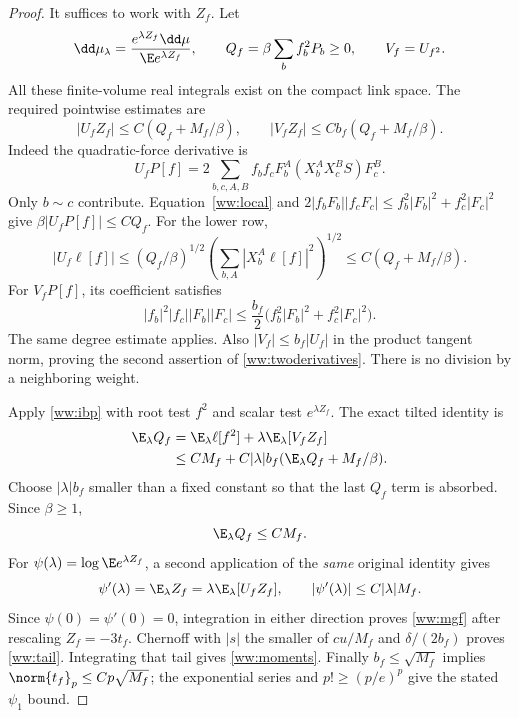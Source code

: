 \begin{proof}
It suffices to work with $Z_f$. Let
\[
 \dd\mu_\lambda
 =\frac{e^{\lambda Z_f}\dd\mu}{\E e^{\lambda Z_f}},
 \qquad
 Q_f=\beta\sum_bf_b^2P_b\ge0,
 \qquad V_f=U_{f^2}.
\]
All these finite-volume real integrals exist on the compact link space. The required pointwise estimates are
\begin{equation}
 |U_fZ_f|\le C(Q_f+M_f/\beta),\qquad
 |V_fZ_f|\le Cb_f(Q_f+M_f/\beta).
 \label{ww:twoderivatives}
\end{equation}
Indeed the quadratic-force derivative is
\[
 U_fP[f]
 =2\sum_{b,c,A,B}f_bf_cF_b^A
      (X_b^AX_c^BS)F_c^B.
\]
Only $b\sim c$ contribute. Equation~\eqref{ww:local} and
$2|f_bF_b||f_cF_c|\le f_b^2|F_b|^2+f_c^2|F_c|^2$ give
$\beta|U_fP[f]|\le CQ_f$. For the lower row,
\[
 |U_f\ell[f]|
 \le (Q_f/\beta)^{1/2}
       \left(\sum_{b,A}|X_b^A\ell[f]|^2\right)^{1/2}
 \le C(Q_f+M_f/\beta).
\]
For $V_fP[f]$, its coefficient satisfies
\[
 |f_b|^2|f_c||F_b||F_c|
 \le \frac{b_f}{2}
       \bigl(f_b^2|F_b|^2+f_c^2|F_c|^2\bigr).
\]
The same degree estimate applies. Also $|V_f|\le b_f|U_f|$ in the product tangent norm, proving the second assertion of \eqref{ww:twoderivatives}. There is no division by a neighboring weight.

Apply \eqref{ww:ibp} with root test $f^2$ and scalar test
$e^{\lambda Z_f}$. The exact tilted identity is
\begin{align}
 \E_\lambda Q_f
 &=\E_\lambda\ell[f^2]
      +\lambda\E_\lambda[V_fZ_f]\notag\\
 &\le CM_f+C|\lambda|b_f
                  (\E_\lambda Q_f+M_f/\beta).
 \label{ww:closure}
\end{align}
Choose $|\lambda|b_f$ smaller than a fixed constant so that the last $Q_f$ term is absorbed. Since $\beta\ge1$,
\begin{equation}
 \E_\lambda Q_f\le CM_f.
 \label{ww:tiltedenergy}
\end{equation}
For $\psi(\lambda)=\log\E e^{\lambda Z_f}$, a second application of the \emph{same} original identity gives
\[
 \psi'(\lambda)=\E_\lambda Z_f
       =\lambda\E_\lambda[U_fZ_f],
 \qquad |\psi'(\lambda)|\le C|\lambda|M_f.
\]
Since $\psi(0)=\psi'(0)=0$, integration in either direction proves
\eqref{ww:mgf} after rescaling $Z_f=-3t_f$.
Chernoff with $|s|$ the smaller of $cu/M_f$ and $\delta/(2b_f)$ proves
\eqref{ww:tail}. Integrating that tail gives \eqref{ww:moments}.
Finally $b_f\le\sqrt{M_f}$ implies
$\norm{t_f}_p\le Cp\sqrt{M_f}$; the exponential series and
$p!\ge(p/e)^p$ give the stated $\psi_1$ bound.
\end{proof}

